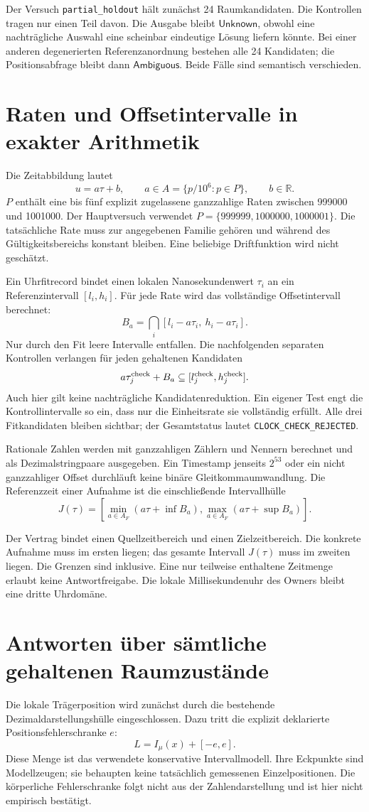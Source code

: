 \documentclass[11pt,a4paper]{article}
\newcommand{\Unknown}{\ensuremath{\mathsf{Unknown}}}
\newcommand{\Ambiguous}{\ensuremath{\mathsf{Ambiguous}}}
\newcommand{\nextsection}[2]{\clearpage{\color{accent}\small\textsf{#1}}\section{#2}}
\begin{document}
Der Versuch \texttt{partial\_holdout} hält zunächst 24 Raumkandidaten.
Die Kontrollen tragen nur einen Teil davon. Die Ausgabe bleibt
\Unknown, obwohl eine nachträgliche Auswahl eine scheinbar eindeutige
Lösung liefern könnte. Bei einer anderen degenerierten Referenzanordnung
bestehen alle 24 Kandidaten; die Positionsabfrage bleibt dann
\Ambiguous. Beide Fälle sind semantisch verschieden.

\nextsection{93 / AFFINE UHRFAMILIE}{Raten und Offsetintervalle in exakter Arithmetik}
Die Zeitabbildung lautet
\[
 u=a\tau+b,\qquad
 a\in A=\{p/10^6:p\in P\},\qquad b\in\mathbb R.
\]
$P$ enthält eine bis fünf explizit zugelassene ganzzahlige Raten
zwischen 999000 und 1001000. Der Hauptversuch verwendet
$P=\{999999,1000000,1000001\}$. Die tatsächliche Rate muss zur
angegebenen Familie gehören und während des Gültigkeitsbereichs
konstant bleiben. Eine beliebige Driftfunktion wird nicht geschätzt.

Ein Uhrfitrecord bindet einen lokalen Nanosekundenwert $\tau_i$
an ein Referenzintervall $[l_i,h_i]$. Für jede Rate wird das
vollständige Offsetintervall berechnet:
\[
 B_a=\bigcap_i[l_i-a\tau_i,\ h_i-a\tau_i].
\]
Nur durch den Fit leere Intervalle entfallen. Die nachfolgenden
separaten Kontrollen verlangen für jeden gehaltenen Kandidaten
\[
 a\tau_j^{\rm check}+B_a
 \subseteq[l_j^{\rm check},h_j^{\rm check}].
\]
Auch hier gilt keine nachträgliche Kandidatenreduktion. Ein eigener
Test engt die Kontrollintervalle so ein, dass nur die Einheitsrate
sie vollständig erfüllt. Alle drei Fitkandidaten bleiben sichtbar;
der Gesamtstatus lautet \texttt{CLOCK\_CHECK\_REJECTED}.

Rationale Zahlen werden mit ganzzahligen Zählern und Nennern
berechnet und als Dezimalstringpaare ausgegeben. Ein Timestamp
jenseits $2^{53}$ oder ein nicht ganzzahliger Offset durchläuft
keine binäre Gleitkommaumwandlung. Die Referenzzeit einer Aufnahme
ist die einschließende Intervallhülle
\[
 J(\tau)=\left[\min_{a\in A_F}(a\tau+\inf B_a),
               \max_{a\in A_F}(a\tau+\sup B_a)\right].
\]

Der Vertrag bindet einen Quellzeitbereich und einen Zielzeitbereich.
Die konkrete Aufnahme muss im ersten liegen; das gesamte Intervall
$J(\tau)$ muss im zweiten liegen. Die Grenzen sind inklusive.
Eine nur teilweise enthaltene Zeitmenge erlaubt keine Antwortfreigabe.
Die lokale Millisekundenuhr des Owners bleibt eine dritte Uhrdomäne.

\nextsection{94 / REGISTRIERTE ABFRAGE}{Antworten über sämtliche gehaltenen Raumzustände}
Die lokale Trägerposition wird zunächst durch die bestehende
Dezimaldarstellungshülle eingeschlossen. Dazu tritt die explizit
deklarierte Positionsfehlerschranke $e$:
\[
 L=I_\mu(x)+[-e,e].
\]
Diese Menge ist das verwendete konservative Intervallmodell.
Ihre Eckpunkte sind Modellzeugen; sie behaupten keine tatsächlich
gemessenen Einzelpositionen. Die körperliche Fehlerschranke folgt
nicht aus der Zahlendarstellung und ist hier nicht empirisch bestätigt.
\end{document}
